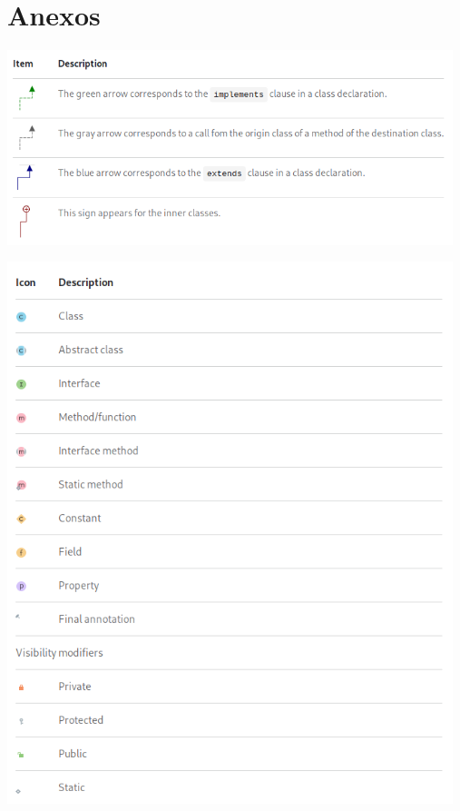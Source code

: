 \documentclass[12pt]{article}
\begin{document}
\newpage

\section{Anexos}

\includegraphics[width=13cm]{arrow_legend.png}

\includegraphics[width=13cm]{icons_legend.png}
\end{document}
